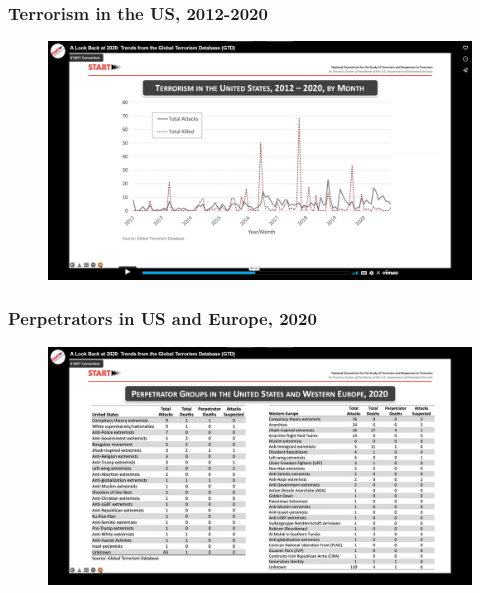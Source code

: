 \documentclass[handout]{beamer}
\begin{document}
\begin{frame} 
	\frametitle{\LARGE{Terrorism in the US, 2012-2020}}
	\begin{figure}[ht!]
		\centering
		\includegraphics[width=\textwidth,height=\textheight,keepaspectratio]{USterrorism2020.png}
	\end{figure}
\end{frame}

\begin{frame} 
	\frametitle{\LARGE{Perpetrators in US and Europe, 2020}}
	\begin{figure}[ht!]
		\centering
		\includegraphics[width=\textwidth,height=\textheight,keepaspectratio]{perpetrators2020.png}
	\end{figure}
\end{frame}
\end{document}
